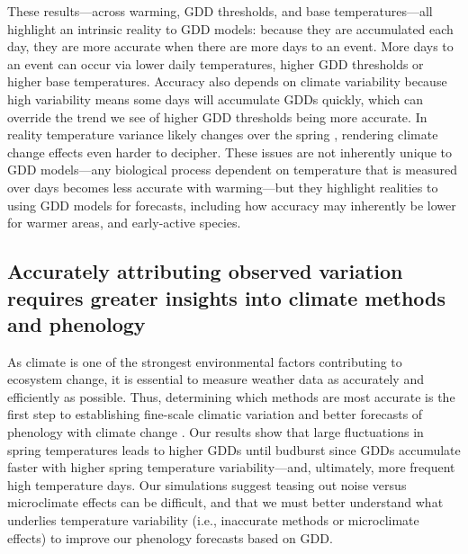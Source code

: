 \documentclass{article}\usepackage[]{graphicx}\usepackage[]{color}
\begin{document}
These results---across warming, GDD thresholds, and base temperatures---all highlight an intrinsic reality to GDD models: because they are accumulated each day, they are more accurate when there are more days to an event. More days to an event can occur via lower daily temperatures, higher GDD thresholds or higher base temperatures. Accuracy also depends on climate variability because high variability means some days will accumulate GDDs quickly, which can override the trend we see of higher GDD thresholds being more accurate. In reality temperature variance likely changes over the spring \citep{Qu2014}, rendering climate change effects even harder to decipher. These issues are not inherently unique to GDD models---any biological process dependent on temperature that is measured over days becomes less accurate with warming---but they highlight realities to using GDD models for forecasts, including how accuracy may inherently be lower for warmer areas, and early-active species. 

\subsection*{Accurately attributing observed variation requires greater insights into climate methods and phenology} 
As climate is one of the strongest environmental factors contributing to ecosystem change, it is essential to measure weather data as accurately and efficiently as possible. Thus, determining which methods are most accurate is the first step to establishing fine-scale climatic variation and better forecasts of phenology with climate change \citep{Laigle2021}. Our results show that large fluctuations in spring temperatures leads to higher GDDs until budburst since GDDs accumulate faster with higher spring temperature variability---and, ultimately, more frequent high temperature days. Our simulations suggest teasing out noise versus microclimate effects can be difficult, and that we must better understand what underlies temperature variability (i.e., inaccurate methods or microclimate effects) to improve our phenology forecasts based on GDD. 
  
\end{document}
